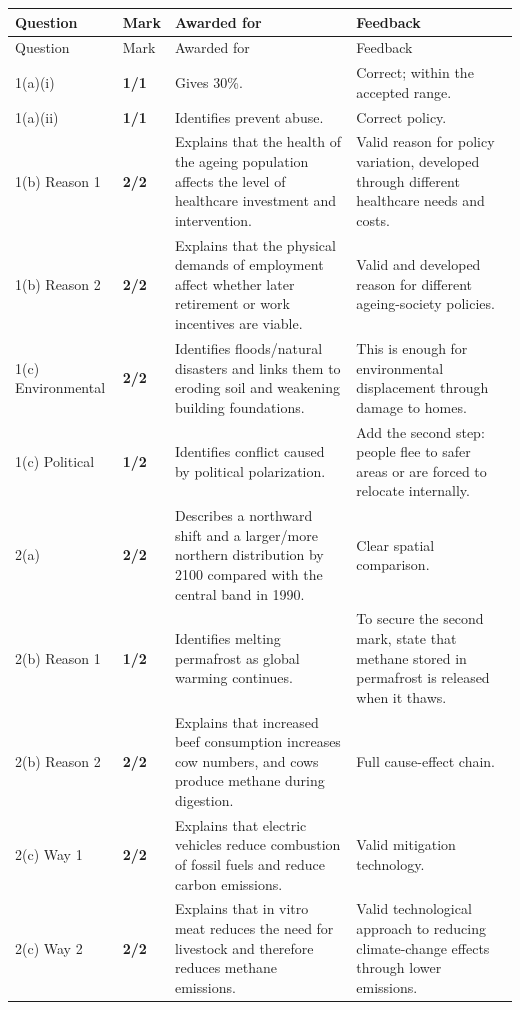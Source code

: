 \documentclass[11pt]{article}
\newcommand{\markcell}[2]{\textbf{#1/#2}}
\begin{document}
\begin{longtable}{@{}p{} p{} p{} p{}@{}}
\toprule
Question & Mark & Awarded for & Feedback \\
\midrule
\endfirsthead
\toprule
Question & Mark & Awarded for & Feedback \\
\midrule
\endhead
1(a)(i) & \markcell{1}{1} & Gives 30\%. & Correct; within the accepted range. \\
1(a)(ii) & \markcell{1}{1} & Identifies prevent abuse. & Correct policy. \\
1(b) Reason 1 & \markcell{2}{2} & Explains that the health of the ageing population affects the level of healthcare investment and intervention. & Valid reason for policy variation, developed through different healthcare needs and costs. \\
1(b) Reason 2 & \markcell{2}{2} & Explains that the physical demands of employment affect whether later retirement or work incentives are viable. & Valid and developed reason for different ageing-society policies. \\
1(c) Environmental & \markcell{2}{2} & Identifies floods/natural disasters and links them to eroding soil and weakening building foundations. & This is enough for environmental displacement through damage to homes. \\
1(c) Political & \markcell{1}{2} & Identifies conflict caused by political polarization. & Add the second step: people flee to safer areas or are forced to relocate internally. \\
\midrule
2(a) & \markcell{2}{2} & Describes a northward shift and a larger/more northern distribution by 2100 compared with the central band in 1990. & Clear spatial comparison. \\
2(b) Reason 1 & \markcell{1}{2} & Identifies melting permafrost as global warming continues. & To secure the second mark, state that methane stored in permafrost is released when it thaws. \\
2(b) Reason 2 & \markcell{2}{2} & Explains that increased beef consumption increases cow numbers, and cows produce methane during digestion. & Full cause-effect chain. \\
2(c) Way 1 & \markcell{2}{2} & Explains that electric vehicles reduce combustion of fossil fuels and reduce carbon emissions. & Valid mitigation technology. \\
2(c) Way 2 & \markcell{2}{2} & Explains that in vitro meat reduces the need for livestock and therefore reduces methane emissions. & Valid technological approach to reducing climate-change effects through lower emissions. \\

\end{longtable}
\end{document}
